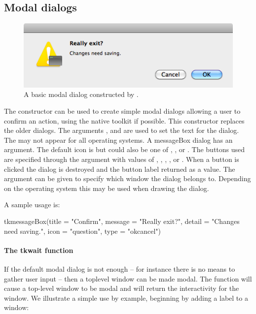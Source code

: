 \subsection{Modal dialogs}
\label{sec:modal-dialogs}

\begin{figure}
  \centering
  \includegraphics[width=.6\textwidth]{fig-tcltk-confirm-dialog.png}
  \caption{A basic modal dialog constructed by .}
  \label{fig:fig-tcltk-confirm-dialog}
\end{figure}

The  constructor can be used to create
simple modal dialogs allowing a user to confirm an action, using the
native toolkit if possible. This constructor replaces the older
 dialogs. The arguments ,
 and 
are used to set the text for the dialog. The  may not
appear for all operating systems. A messageBox dialog has an
 argument. The default icon is
 but could also be one of , ,
or . The buttons used are specified through the
 argument with values of ,
, , , or
. When a button is clicked the dialog is destroyed
and the button label returned as a value. The argument
 can be given to specify which window
the dialog belongs to. Depending on the operating system this may be
used when drawing the dialog.

A sample usage is:
\begin{Schunk}
\begin{Sinput}
 tkmessageBox(title = "Confirm", message = "Really exit?", 
              detail = "Changes need saving.", 
              icon = "question", type = "okcancel")
\end{Sinput}
\end{Schunk}

\paragraph{The tkwait function}
If the default modal dialog is not enough -- for instance there is no
means to gather user input -- then a toplevel window can be made
modal. The  function will cause a top-level window to
be modal and  will return the interactivity
for the window. We illustrate a simple use by example, beginning by
adding a label to a window:

